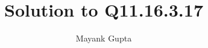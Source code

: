 \documentclass[journal,12pt,onecolumn]{IEEEtran}
\theoremstyle{remark}
\begin{document}
%




\vspace{3cm}

\title{
	Solution to Q11.16.3.17
}
\author{ Mayank Gupta%
}


%
%
%

% 
%



% 
\end{document}
